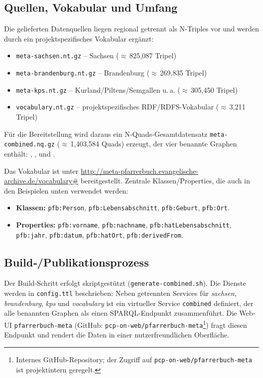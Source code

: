 \subsection{Quellen, Vokabular und Umfang}
Die gelieferten Datenquellen liegen regional getrennt als N-Triples vor und werden durch ein projektspezifisches Vokabular ergänzt:
\begin{itemize}
\item \texttt{meta-sachsen.nt.gz} – Sachsen ($\approx$\,825{,}087 Tripel)
\item \texttt{meta-brandenburg.nt.gz} – Brandenburg ($\approx$\,269{,}835 Tripel)
\item \texttt{meta-kps.nt.gz} – Kurland/Piltens/Semgallen u.\,a. ($\approx$\,305{,}450 Tripel)
\item \texttt{vocabulary.nt.gz} – projektspezifisches RDF/RDFS-Vokabular ($\approx$\,3{,}211 Tripel)
\end{itemize}
Für die Bereitstellung wird daraus ein N-Quads-Gesamtdatensatz \texttt{meta-combined.nq.gz} ($\approx$\,1{,}403{,}584 Quads) erzeugt, der vier benannte Graphen enthält:
, ,  und .

Das Vokabular ist unter
\url{http://meta-pfarrerbuch.evangelische-archive.de/vocabulary\#} bereitgestellt. Zentrale Klassen/Properties, die auch in den Beispielen unten verwendet werden:
\begin{itemize}
\item \textbf{Klassen:} \texttt{pfb:Person}, \texttt{pfb:Lebensabschnitt}, \texttt{pfb:Geburt}, \texttt{pfb:Ort}.
\item \textbf{Properties:} \texttt{pfb:vorname}, \texttt{pfb:nachname}, \texttt{pfb:hatLebensabschnitt}, \texttt{pfb:jahr}, \texttt{pfb:datum}, \texttt{pfb:hatOrt}, \texttt{pfb:derivedFrom}.
\end{itemize}

\subsection{Build‐/Publikationsprozess}
Der Build-Schritt erfolgt skriptgestützt (\texttt{generate-combined.sh}). Die Dienste werden in \texttt{config.ttl} beschrieben: Neben getrennten Services für \emph{sachsen}, \emph{brandenburg}, \emph{kps} und \emph{vocabulary} ist ein virtueller Service \texttt{combined} definiert, der alle benannten Graphen als einen SPARQL-Endpunkt zusammenführt. Die Web-UI \texttt{pfarrerbuch-meta} (GitHub: \texttt{pcp-on-web/pfarrerbuch-meta}\footnote{Internes GitHub-Repository; der Zugriff auf \texttt{pcp-on-web/pfarrerbuch-meta} ist projektintern geregelt.}) fragt diesen Endpunkt und rendert die Daten in einer nutzerfreundlichen Oberfläche.

